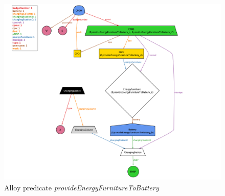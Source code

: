 \documentclass[a4paper]{report}
\begin{document}
\begin{landscape}
\begin{figure}[hp]
\includegraphics[angle=0, scale=0.6]{dynamicWorld}
\caption{Alloy predicate \textit{provideEnergyFurnitureToBattery}}
\label{fig:provideEnergy}
\end{figure}
\end{landscape}


\restoregeometry
\end{document}

